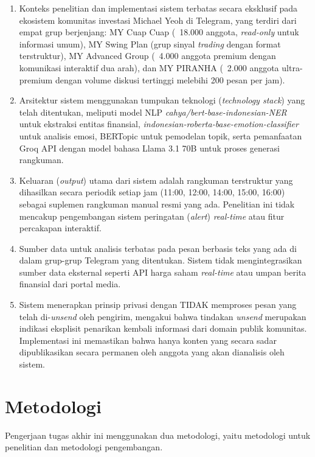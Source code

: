 \begin{enumerate}
\item Konteks penelitian dan implementasi sistem terbatas secara eksklusif pada ekosistem komunitas investasi Michael Yeoh di Telegram, yang terdiri dari empat grup berjenjang: MY Cuap Cuap (~18.000 anggota, \textit{read-only} untuk informasi umum), MY Swing Plan (grup sinyal \textit{trading} dengan format terstruktur), MY Advanced Group (~4.000 anggota premium dengan komunikasi interaktif dua arah), dan MY PIRANHA (~2.000 anggota ultra-premium dengan volume diskusi tertinggi melebihi 200 pesan per jam).

\item Arsitektur sistem menggunakan tumpukan teknologi (\textit{technology stack}) yang telah ditentukan, meliputi model NLP \textit{cahya/bert-base-indonesian-NER} untuk ekstraksi entitas finansial, \textit{indonesian-roberta-base-emotion-classifier} untuk analisis emosi, BERTopic untuk pemodelan topik, serta pemanfaatan Groq API dengan model bahasa Llama 3.1 70B untuk proses generasi rangkuman.

\item Keluaran (\textit{output}) utama dari sistem adalah rangkuman terstruktur yang dihasilkan secara periodik setiap jam (11:00, 12:00, 14:00, 15:00, 16:00) sebagai suplemen rangkuman manual resmi yang ada. Penelitian ini tidak mencakup pengembangan sistem peringatan (\textit{alert}) \textit{real-time} atau fitur percakapan interaktif.

\item Sumber data untuk analisis terbatas pada pesan berbasis teks yang ada di dalam grup-grup Telegram yang ditentukan. Sistem tidak mengintegrasikan sumber data eksternal seperti API harga saham \textit{real-time} atau umpan berita finansial dari portal media.

\item Sistem menerapkan prinsip privasi dengan TIDAK memproses pesan yang telah di-\textit{unsend} oleh pengirim, mengakui bahwa tindakan \textit{unsend} merupakan indikasi eksplisit penarikan kembali informasi dari domain publik komunitas. Implementasi ini memastikan bahwa hanya konten yang secara sadar dipublikasikan secara permanen oleh anggota yang akan dianalisis oleh sistem.
\end{enumerate}

\section{Metodologi}
Pengerjaan tugas akhir ini menggunakan dua metodologi, yaitu metodologi untuk penelitian dan metodologi pengembangan.

